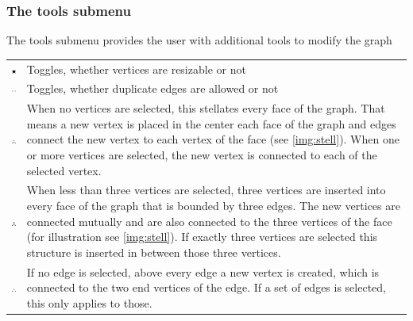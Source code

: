 {\subsubsection{The tools submenu}
The tools submenu provides the user with additional tools to modify the graph\\
\label{toolsSub}
\begin{tabular}{p{}p{}}
\includegraphics[scale=0.6]{figures/icons/resize_nodes.png}& Toggles, whether vertices are resizable or not\\
\includegraphics[scale=0.6]{figures/icons/doubleEdges.png}& Toggles, whether duplicate edges are allowed or not\\
\includegraphics[scale=0.6]{figures/icons/stellation.png}& When no vertices are selected, this stellates every face of the graph. That means a new vertex is placed in the center each face of the graph and edges connect the new vertex to each vertex of the face (see \autoref{img:stell}). When one or more vertices are selected, the new vertex is connected to each of the selected vertex.\\
\includegraphics[scale=0.6]{figures/icons/three_stellation.png}& When less than three vertices are selected, three vertices are inserted into every face of the graph that is bounded by three edges. The new vertices are connected mutually and are also connected to the three vertices of the face (for illustration see \autoref{img:stell}). If exactly three vertices are selected this structure is inserted in between those three vertices.\\
\includegraphics[scale=0.6]{figures/icons/edgeStellation.png}& If no edge is selected, above every edge a new vertex is created, which is connected to the two end vertices of the edge. If a set of edges is selected, this only applies to those.\\

\end{tabular}}
